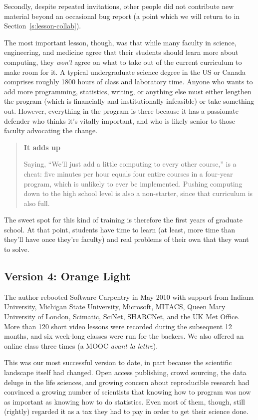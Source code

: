 \documentclass[10pt,a4paper,twocolumn]{article}
\begin{document}
Secondly, despite repeated invitations, other people did not
contribute new material beyond an occasional bug report (a point which
we will return to in Section~\ref{s:lesson-collab}).

The most important lesson, though, was that while many faculty in
science, engineering, and medicine agree that their students should
learn more about computing, they \emph{won't} agree on what to take
out of the current curriculum to make room for it. A typical
undergraduate science degree in the US or Canada comprises roughly
1800 hours of class and laboratory time. Anyone who wants to add more
programming, statistics, writing, or anything else must either
lengthen the program (which is financially and institutionally
infeasible) or take something out. However, everything in the program
is there because it has a passionate defender who thinks it's vitally
important, and who is likely senior to those faculty advocating the
change.

\begin{quote}
\textbf{It adds up}

Saying, ``We'll just add a little computing to every other course,'' is
a cheat: five minutes per hour equals four entire courses in a four-year
program, which is unlikely to ever be implemented. Pushing computing
down to the high school level is also a non-starter, since that
curriculum is also full.
\end{quote}

The sweet spot for this kind of training is therefore the first years
of graduate school. At that point, students have time to learn (at
least, more time than they'll have once they're faculty) and real
problems of their own that they want to solve.

\subsection{Version 4: Orange Light}\label{s:version4}

The author rebooted Software Carpentry in May 2010 with support from
Indiana University, Michigan State University, Microsoft, MITACS,
Queen Mary University of London, Scimatic, SciNet, SHARCNet, and the
UK Met Office. More than 120 short video lessons were recorded during
the subsequent 12 months, and six week-long classes were run for the
backers. We also offered an online class three times (a MOOC
\emph{avant la lettre}).

This was our most successful version to date, in part because the
scientific landscape itself had changed. Open access publishing, crowd
sourcing, the data deluge in the life sciences, and growing concern
about reproducible research had convinced a growing number of
scientists that knowing how to program was now as important as knowing
how to do statistics.  Even most of them, though, still (rightly)
regarded it as a tax they had to pay in order to get their science
done.
\end{document}
